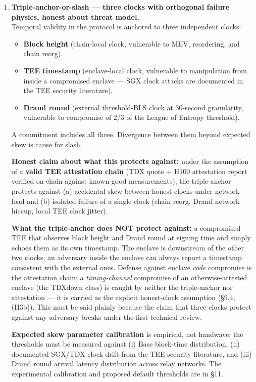 \documentclass[11pt]{article}
\begin{document}
\begin{enumerate}
\item \textbf{Triple-anchor-or-slash --- three clocks with orthogonal failure physics, honest about threat model.}\\
Temporal validity in the protocol is anchored to three independent clocks:
\begin{itemize}
\item \textbf{Block height} (chain-local clock, vulnerable to MEV, reordering, and chain reorg).
\item \textbf{TEE timestamp} (enclave-local clock, vulnerable to manipulation from inside a compromised enclave --- SGX clock attacks are documented in the TEE security literature).
\item \textbf{Drand round} (external threshold-BLS clock at 30-second granularity, vulnerable to compromise of 2/3 of the League of Entropy threshold).
\end{itemize}

A commitment includes all three. Divergence between them beyond expected skew is cause for slash.

\textbf{Honest claim about what this protects against:} under the assumption of a \textbf{valid TEE attestation chain} (TDX quote + H100 attestation report verified on-chain against known-good measurements), the triple-anchor protects against (a) accidental skew between honest clocks under network load and (b) isolated failure of a single clock (chain reorg, Drand network hiccup, local TEE clock jitter).

\textbf{What the triple-anchor does NOT protect against:} a compromised TEE that observes block height and Drand round at signing time and simply echoes them as its own timestamp. The enclave is downstream of the other two clocks; an adversary inside the enclave can always report a timestamp consistent with the external ones. Defense against enclave \emph{code} compromise is the attestation chain; a \emph{timing-channel} compromise of an otherwise-attested enclave (the TDXdown class) is caught by neither the triple-anchor nor attestation --- it is carried as the explicit honest-clock assumption (\S9.4, (H3b)). This must be said plainly because the claim that three clocks protect against any adversary breaks under the first technical review.

\textbf{Expected skew parameter calibration} is empirical, not handwave: the thresholds must be measured against (i) Base block-time distribution, (ii) documented SGX/TDX clock drift from the TEE security literature, and (iii) Drand round arrival latency distribution across relay networks. The experimental calibration and proposed default thresholds are in \S11.


\end{enumerate}
\end{document}
